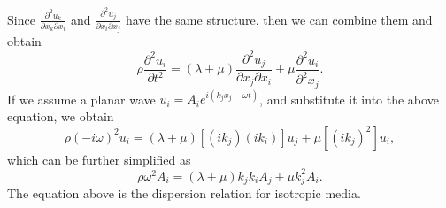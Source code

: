 \documentclass[referee]{../../../texCls/mayWithTeaser}
\begin{document}
Since $\frac{\partial^2 u_k}{\partial x_k\partial x_i}$ 
and $\frac{\partial^2 u_j}{\partial x_i\partial x_j}$ 
have the same structure, then we can combine them and obtain
\begin{equation}
  \rho\frac{\partial^2 u_i}{\partial t^2}=
  (\lambda+\mu)\frac{\partial^2 u_j}{\partial x_j\partial x_i}
   +\mu\frac{\partial^2 u_i}{\partial^2 x_j}.
\end{equation}
If we assume a planar wave $u_i=A_ie^{i(k_jx_j-\omega t)}$, and substitute it into the
above equation, we obtain
\begin{equation}
  \rho(-i\omega)^2u_i=(\lambda+\mu)[(ik_j)(ik_i)]u_j+\mu[(ik_j)^2]u_i,
\end{equation}
which can be further simplified as
\begin{equation}
  \rho \omega^2A_i=(\lambda+\mu)k_jk_iA_j+\mu k^2_jA_i.
\end{equation}
The equation above is the dispersion relation for isotropic media.
\end{document}
